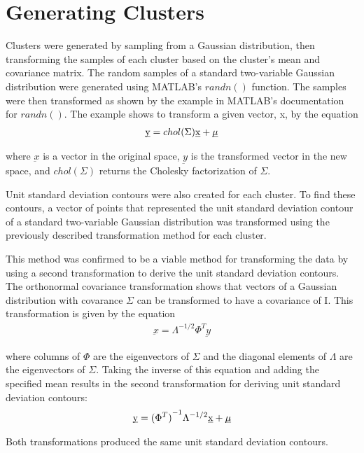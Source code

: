 \section{Generating Clusters}
Clusters were generated by sampling from a Gaussian distribution, then transforming the samples of each cluster based on the cluster's mean and covariance matrix. The random samples of a standard two-variable Gaussian distribution were generated using MATLAB's $randn()$ function. The samples were then transformed as shown by the example in MATLAB's documentation for $randn()$. The example shows to transform a given vector, x, by the equation
\begin{eqnarray}
\label{eqn:chol_transform}
\underbar {y} = chol(\Sigma) \underbar {x} + \underbar {$\mu$}
\end{eqnarray}

where $\underbar{x}$ is a vector in the original space, $\underbar{y}$ is the transformed vector in the new space, and $chol(\Sigma)$ returns the Cholesky factorization of $\Sigma$.

Unit standard deviation contours were also created for each cluster. To find these contours, a vector of points that represented the unit standard deviation contour of a standard two-variable Gaussian distribution was transformed using the previously described transformation method for each cluster.

This method was confirmed to be a viable method for transforming the data by using a second transformation to derive the unit standard deviation contours. The orthonormal covariance transformation shows that vectors of a Gaussian distribution with covarance $\Sigma$ can be transformed to have a covariance of I. This transformation is given by the equation
\begin{eqnarray}
\label{eqn:ortho_transform}
\underbar{x} = {\Lambda}^{-1/2} \Phi^T \underbar{y}
\end{eqnarray}

where columns of $\Phi$ are the eigenvectors of $\Sigma$ and the diagonal elements of $\Lambda$ are the eigenvectors of $\Sigma$. Taking the inverse of this equation and adding the specified mean results in the second transformation for deriving unit standard deviation contours:
\begin{eqnarray}
\label{eqn:ortho_inv_transform}
\underbar{y} = {(\Phi^{T})}^{-1} \Lambda^{-1/2}\underbar{x}+\underbar{$\mu$}
\end{eqnarray}

Both transformations produced the same unit standard deviation contours.
 
